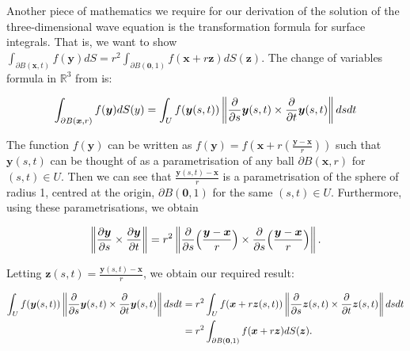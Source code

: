 \documentclass[a4paper, 12pt]{article}
\numberwithin{equation}{section}
\begin{document}
Another piece of mathematics we require for our derivation of the solution of
the three-dimensional wave equation is the transformation formula for surface
integrals. That is, we want to show $\int_{\partial
B(\boldsymbol{x},t)}f(\boldsymbol{y})dS=r^2\int_{\partial B(\boldsymbol{0},1)}
f(\boldsymbol{x}+r\boldsymbol{z})dS(\boldsymbol{z})$. The change of variables
formula in $\mathbb{R}^3$ from \cite{LooSter} is:

\begin{equation*}
    \int_{\partial B(\boldsymbol{x},r)}f(\boldsymbol{y})dS(y)=\int_U f(\boldsymbol{y}(s,t))\left\| \diffp[1]{}{s}\boldsymbol{y}(s, t) \times \diffp[1]{}{t}\boldsymbol{y}(s, t) \right \|ds dt
\end{equation*}

The function $f(\boldsymbol{y})$ can be written as
$f(\boldsymbol{y})=f(\boldsymbol{x}+r(\frac{\boldsymbol{y}-\boldsymbol{x}}{r}))$
such that $\boldsymbol{y}(s,t)$ can be thought of as a parametrisation of any
ball $\partial B(\boldsymbol{x},r)$ for $(s,t)\in U$. Then we can see that
$\frac{\boldsymbol{y}(s,t)-\boldsymbol{x}}{r}$ is a parametrisation of the
sphere of radius 1, centred at the origin, $\partial B(\boldsymbol{0},1)$ for
the same $(s,t)\in U$. Furthermore, using these parametrisations, we obtain

\begin{equation*}
    \left \| \diffp[1]{\boldsymbol{y}}{s} \times \diffp[1]{\boldsymbol{y}}{t} \right \| =r^2 \left \| \diffp[1]{}{s}\Big(\frac{\boldsymbol{y}-\boldsymbol{x}}{r}\Big) \times \diffp[1]{}{s}\Big( \frac{\boldsymbol{y}-\boldsymbol{x}}{r}\Big) \right \|.
\end{equation*}

Letting $\boldsymbol{z}(s,t)=\frac{\boldsymbol{y}(s,t)-\boldsymbol{x}}{r}$, we
obtain our required result:

\begin{equation*}
    \begin{aligned}
    \int_U f(\boldsymbol{y}(s,t)) \left \| \diffp[1]{}{s}\boldsymbol{y}(s, t) \times \diffp{}{t}\boldsymbol{y}(s, t) \right \| dsdt&=r^2\int_U f(\boldsymbol{x}+r\boldsymbol{z}(s,t)) \left \| \diffp[1]{}{s}\boldsymbol{z}(s, t) \times \diffp[1]{}{t}\boldsymbol{z}(s, t) \right \| dsdt\\
    &=r^2\int_{\partial B(\boldsymbol{0},1)}f(\boldsymbol{x}+r\boldsymbol{z})dS(\boldsymbol{z}).
    \end{aligned}
\end{equation*}
\end{document}
